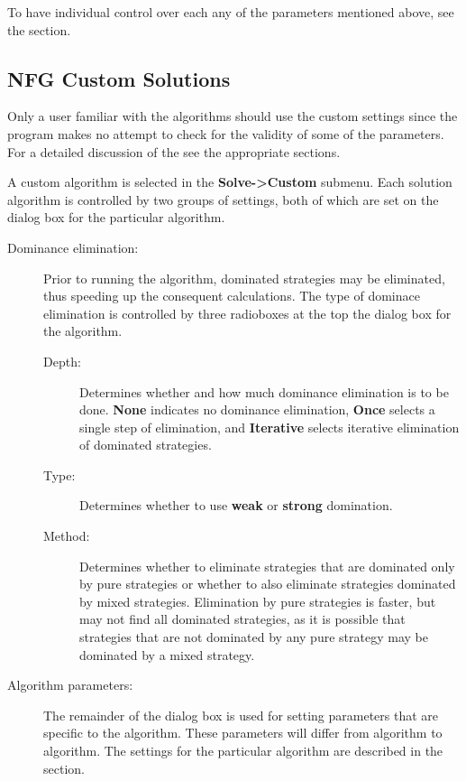 \documentclass[12pt]{report}
\begin{document}
To have individual control over each any of the parameters mentioned above, see
the  section.

\subsection{NFG Custom Solutions}\label{NFGCustomSolutions}
Only a user familiar with the algorithms should use the custom
settings since the program makes no attempt to check for the validity
of some of the parameters.  For a detailed discussion of the 
 see the appropriate sections.

A custom algorithm is selected in the {\bf Solve->Custom} submenu.
Each solution algorithm is controlled by two groups of settings, both
of which are set on the dialog box for the particular algorithm.
\begin{description}
\item[Dominance elimination:] Prior to running the algorithm,
dominated strategies may be eliminated, thus speeding up the
consequent calculations.  The type of dominace elimination is
controlled by three radioboxes at the top the dialog box for the
algorithm.
\begin{description}
\item[Depth:] Determines whether and how much dominance
elimination is to be done.  {\bf None} indicates no dominance
elimination, {\bf Once} selects a single step of elimination, and {\bf 
Iterative} selects iterative elimination of dominated strategies.
\item[Type:] Determines whether to use {\bf weak} or {\bf strong}
domination.
\item[Method:] Determines whether to eliminate strategies that are
dominated only by pure strategies or whether to also eliminate
strategies dominated by mixed strategies.  Elimination by pure
strategies is faster, but may not find all dominated strategies, as it
is possible that strategies that are not dominated by any pure
strategy may be dominated by a mixed strategy.
\end{description}
\item[Algorithm parameters:] The remainder of the dialog box is used
for setting parameters that are specific to the algorithm.  These
parameters will differ from algorithm to algorithm.  The settings for
the particular algorithm are described in the 
 section.
\end{description}
\end{document}
